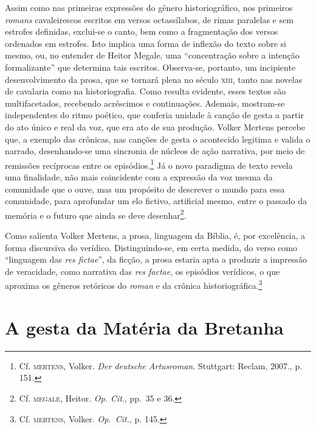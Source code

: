 Assim como nas primeiras expressões do gênero historiográfico, nos
primeiros \textit{romans} cavaleirescos escritos em versos
octassílabos, de rimas paralelas e sem estrofes definidas, exclui-se o
canto, bem como a fragmentação dos versos ordenados em estrofes. Isto
implica uma forma de inflexão do texto sobre si mesmo, ou, no entender
de Heitor Megale, uma “concentração sobre a intenção formalizante” que
determina tais escritos. Observa-se, portanto, um incipiente
desenvolvimento da prosa, que se tornará plena no século \textsc{xiii}, tanto
nas novelas de cavalaria como na historiografia. Como resulta evidente,
esses textos são multifacetados, recebendo acréscimos e continuações.
Ademais, mostram-se independentes do ritmo poético, que conferia
unidade à canção de gesta a partir do ato único e real da voz, que era
ato de sua produção. Volker Mertens percebe que, a exemplo das
crônicas, nas canções de gesta o acontecido legitima e valida o
narrado, desenhando-se uma sincronia de núcleos de ação narrativa, por
meio de remissões recíprocas entre os episódios.\footnote{ Cf. \textsc{mertens},
Volker. \textit{Der deutsche Artusroman}. Stuttgart: Reclam, 2007., p.
151.} Já o novo paradigma de texto revela uma finalidade, não mais
coincidente com a expressão da voz mesma da comunidade que o ouve, mas
um propósito de descrever o mundo para essa comunidade, para aprofundar
um elo fictivo, artificial mesmo, entre o passado da memória e o futuro
que ainda se deve desenhar\footnote{ Cf. \textsc{megale}, Heitor. \textit{Op.
Cit}., pp.~35 e 36.}. 

Como salienta Volker Mertens, a prosa, linguagem da Bíblia, é, por
excelência, a forma discursiva do verídico. Distinguindo-se, em certa
medida, do verso como “linguagem das \textit{res fictae}”, da ficção, a
prosa estaria apta a produzir a impressão de veracidade, como narrativa
das \textit{res factae}, os episódios verídicos, o que aproxima os
gêneros retóricos do \textit{roman} e da crônica
historiográfica.\footnote{ Cf. \textsc{mertens}, Volker.\textit{ Op.~Cit.}, p.
145.} 

\section{A gesta da Matéria da Bretanha}

